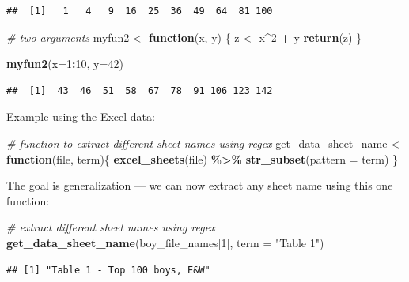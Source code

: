 \documentclass[
]{book}
\newenvironment{Shaded}{\begin{snugshade}}{\end{snugshade}}
\newcommand{\CommentTok}[1]{\textcolor[rgb]{0.56,0.35,0.01}{\textit{#1}}}
\newcommand{\ControlFlowTok}[1]{\textcolor[rgb]{0.13,0.29,0.53}{\textbf{#1}}}
\newcommand{\DataTypeTok}[1]{\textcolor[rgb]{0.13,0.29,0.53}{#1}}
\newcommand{\DecValTok}[1]{\textcolor[rgb]{0.00,0.00,0.81}{#1}}
\newcommand{\KeywordTok}[1]{\textcolor[rgb]{0.13,0.29,0.53}{\textbf{#1}}}
\newcommand{\NormalTok}[1]{#1}
\newcommand{\OperatorTok}[1]{\textcolor[rgb]{0.81,0.36,0.00}{\textbf{#1}}}
\newcommand{\StringTok}[1]{\textcolor[rgb]{0.31,0.60,0.02}{#1}}
\begin{document}
\begin{verbatim}
##  [1]   1   4   9  16  25  36  49  64  81 100
\end{verbatim}

\begin{Shaded}
\begin{Highlighting}[]
\CommentTok{\# two arguments}
\NormalTok{myfun2 \textless{}{-}}\StringTok{ }\ControlFlowTok{function}\NormalTok{(x, y) \{}
\NormalTok{  z \textless{}{-}}\StringTok{ }\NormalTok{x}\OperatorTok{\^{}}\DecValTok{2} \OperatorTok{+}\StringTok{ }\NormalTok{y}
  \KeywordTok{return}\NormalTok{(z)}
\NormalTok{\}}

\KeywordTok{myfun2}\NormalTok{(}\DataTypeTok{x=}\DecValTok{1}\OperatorTok{:}\DecValTok{10}\NormalTok{, }\DataTypeTok{y=}\DecValTok{42}\NormalTok{)}
\end{Highlighting}
\end{Shaded}

\begin{verbatim}
##  [1]  43  46  51  58  67  78  91 106 123 142
\end{verbatim}

Example using the Excel data:

\begin{Shaded}
\begin{Highlighting}[]
\CommentTok{\# function to extract different sheet names using regex}
\NormalTok{get\_data\_sheet\_name \textless{}{-}}\StringTok{ }\ControlFlowTok{function}\NormalTok{(file, term)\{}
  \KeywordTok{excel\_sheets}\NormalTok{(file) }\OperatorTok{\%\textgreater{}\%}\StringTok{ }\KeywordTok{str\_subset}\NormalTok{(}\DataTypeTok{pattern =}\NormalTok{ term)}
\NormalTok{\}}
\end{Highlighting}
\end{Shaded}

The goal is generalization --- we can now extract any sheet name using this one function:

\begin{Shaded}
\begin{Highlighting}[]
\CommentTok{\# extract different sheet names using regex}
\KeywordTok{get\_data\_sheet\_name}\NormalTok{(boy\_file\_names[}\DecValTok{1}\NormalTok{], }\DataTypeTok{term =} \StringTok{"Table 1"}\NormalTok{)}
\end{Highlighting}
\end{Shaded}

\begin{verbatim}
## [1] "Table 1 - Top 100 boys, E&W"
\end{verbatim}
\end{document}
